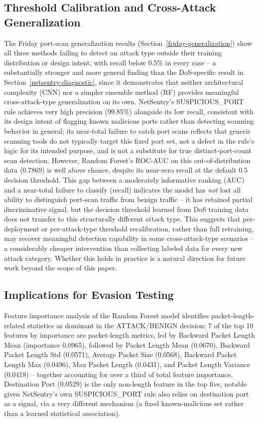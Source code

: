 \documentclass[conference]{IEEEtran}
\begin{document}
\subsection{Threshold Calibration and Cross-Attack Generalization}
 
The Friday port-scan generalization results (Section~\ref{friday-generalization}) show all three methods failing to detect an attack type outside their training distribution or design intent, with recall below 0.5\% in every case -- a substantially stronger and more general finding than the DoS-specific result in Section~\ref{netsentry-diagnostic}, since it demonstrates that neither architectural complexity (CNN) nor a simpler ensemble method (RF) provides meaningful cross-attack-type generalization on its own. NetSentry's SUSPICIOUS\_PORT rule achieves very high precision (99.85\%) alongside its low recall, consistent with its design intent of flagging known malicious ports rather than detecting scanning behavior in general; its near-total failure to catch port scans reflects that generic scanning tools do not typically target this fixed port set, not a defect in the rule's logic for its intended purpose, and is not a substitute for true distinct-port-count scan detection. However, Random Forest's ROC-AUC on this out-of-distribution data (0.7869) is well above chance, despite its near-zero recall at the default 0.5 decision threshold. This gap between a moderately informative ranking (AUC) and a near-total failure to classify (recall) indicates the model has \emph{not} lost all ability to distinguish port-scan traffic from benign traffic -- it has retained partial discriminative signal, but the decision threshold learned from DoS training data does not transfer to this structurally different attack type. This suggests that per-deployment or per-attack-type threshold recalibration, rather than full retraining, may recover meaningful detection capability in some cross-attack-type scenarios -- a considerably cheaper intervention than collecting labeled data for every new attack category. Whether this holds in practice is a natural direction for future work beyond the scope of this paper.
 
\subsection{Implications for Evasion Testing}
 
Feature importance analysis of the Random Forest model identifies packet-length-related statistics as dominant in the ATTACK/BENIGN decision: 7 of the top 10 features by importance are packet-length metrics, led by Backward Packet Length Mean (importance 0.0965), followed by Packet Length Mean (0.0670), Backward Packet Length Std (0.0571), Average Packet Size (0.0568), Backward Packet Length Max (0.0496), Max Packet Length (0.0431), and Packet Length Variance (0.0418) -- together accounting for over a third of total feature importance. Destination Port (0.0529) is the only non-length feature in the top five, notable given NetSentry's own SUSPICIOUS\_PORT rule also relies on destination port as a signal, via a very different mechanism (a fixed known-malicious set rather than a learned statistical association).
 
\end{document}
